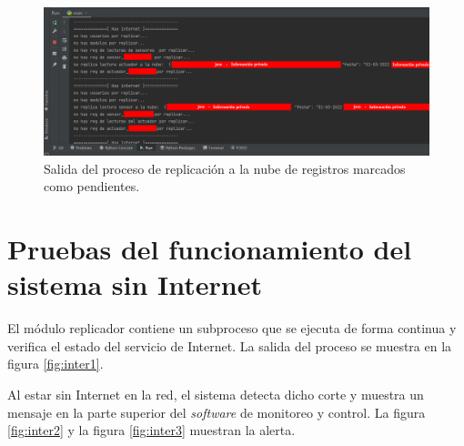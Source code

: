 \begin{figure}[htpb]
\centering 
\includegraphics[width=1.0\textwidth]{./Figures/test/replicador/sinReplicar2.png}
\caption{Salida del proceso de replicación a la nube de registros marcados como pendientes.}
\label{fig:r2}
\end{figure}


\section{Pruebas del funcionamiento del sistema sin Internet}

El módulo replicador contiene un subproceso que se ejecuta de forma continua y verifica el estado del servicio de Internet. La salida del proceso se muestra en la figura \ref{fig:inter1}. 

Al estar sin Internet en la red, el sistema detecta dicho corte y muestra un mensaje en la parte superior del \emph{software} de monitoreo y control. La figura \ref{fig:inter2} y la figura \ref{fig:inter3} muestran la alerta.

